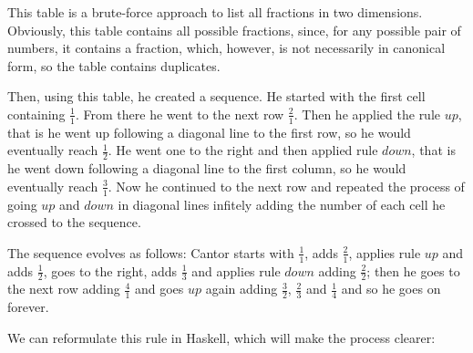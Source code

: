 \documentclass[tikz]{scrreprt}
\newcommand{\Varid}[1]{\mathit{#1}}
\begin{document}
This table is a brute-force approach
to list all fractions in two dimensions.
Obviously, this table contains all possible fractions,
since, for any possible pair of numbers, it contains
a fraction, which, however, is not necessarily
in canonical form, so the table contains duplicates.

Then, using this table, he created a sequence.
He started with the first cell containing $\frac{1}{1}$.
From there he went to the next row $\frac{2}{1}$.
Then he applied the rule \ensuremath{\Varid{up}},
that is he went up following a diagonal line to the first row,
so he would eventually reach $\frac{1}{2}$.
He went one to the right and then applied rule \ensuremath{\Varid{down}},
that is he went down following a diagonal line
to the first column, so he would eventually reach $\frac{3}{1}$.
Now he continued to the next row and repeated 
the process of going \ensuremath{\Varid{up}} and \ensuremath{\Varid{down}} in
diagonal lines infitely adding the number of each
cell he crossed to the sequence.

The sequence evolves as follows:
Cantor starts with $\frac{1}{1}$, adds $\frac{2}{1}$,
applies rule \ensuremath{\Varid{up}} and adds $\frac{1}{2}$,
goes to the right, adds $\frac{1}{3}$ and
applies rule \ensuremath{\Varid{down}} adding $\frac{2}{2}$;
then he goes to the next row adding $\frac{4}{1}$
and goes \ensuremath{\Varid{up}} again adding $\frac{3}{2}$,
$\frac{2}{3}$ and $\frac{1}{4}$ and so he
goes on forever.

We can reformulate this rule in Haskell,
which will make the process clearer:
\end{document}
